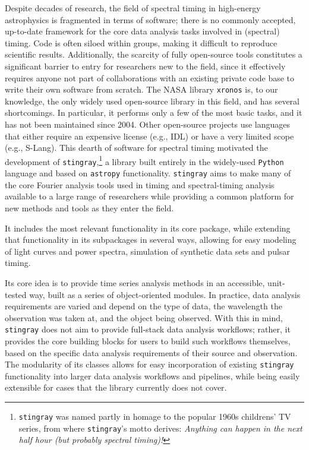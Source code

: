 \documentclass[twocolumn]{aastex62}
\newcommand{\python}{\texttt{Python}\xspace}
\newcommand{\stingray}{\texttt{stingray}\xspace}
\newcommand{\astropy}{\texttt{astropy}\xspace}
\begin{document}
Despite decades of research, the field of spectral timing in high-energy astrophysics is fragmented in terms of software; there is no commonly accepted, up-to-date framework for the core data analysis tasks involved in (spectral) timing. 
Code is often siloed within groups, making it difficult to reproduce scientific results. 
Additionally, the scarcity of fully open-source tools constitutes a significant barrier to entry for researchers new to the field, since it effectively requires anyone not part of collaborations with an existing private code base to write their own software from scratch. 
The NASA library \texttt{xronos} is, to our knowledge, the only widely used open-source library in this field, and has several shortcomings. 
In particular, it performs only a few of the most basic tasks, and it has not been maintained since 2004. 
Other open-source projects use languages that either require an expensive license (e.g., IDL) or have a very limited scope (e.g., S-Lang).
This dearth of  software for spectral timing motivated the development of \stingray,\footnote{\stingray was named partly in homage to the popular 1960s childrens' TV series, from where \stingray's motto derives: \textit{Anything can happen in the next half hour (but probably spectral timing)!}} a library built entirely in the widely-used \python language and based on \astropy functionality. 
\stingray aims to make many of the core Fourier analysis tools used in timing and spectral-timing analysis available to a large range of researchers while providing a common platform for new methods and tools as they enter the field. 

It includes the most relevant functionality in its core package, while extending that functionality in its subpackages in several ways, allowing for easy modeling of light curves and power spectra, simulation of synthetic data sets and pulsar timing. 

Its core idea is to provide time series analysis methods in an accessible, unit-tested way, built as a series of object-oriented modules. 
In practice, data analysis requirements are varied and depend on the type of data, the wavelength the observation was taken at, and the object being observed. 
With this in mind, \stingray does not aim to provide full-stack data analysis workflows; rather, it provides the core building blocks for users to build such workflows themselves, based on the specific data analysis requirements of their source and observation. 
The modularity of its classes allows for easy incorporation of existing \stingray functionality into larger data analysis workflows and pipelines, while being easily extensible for cases that the library currently does not cover. 
\end{document}
